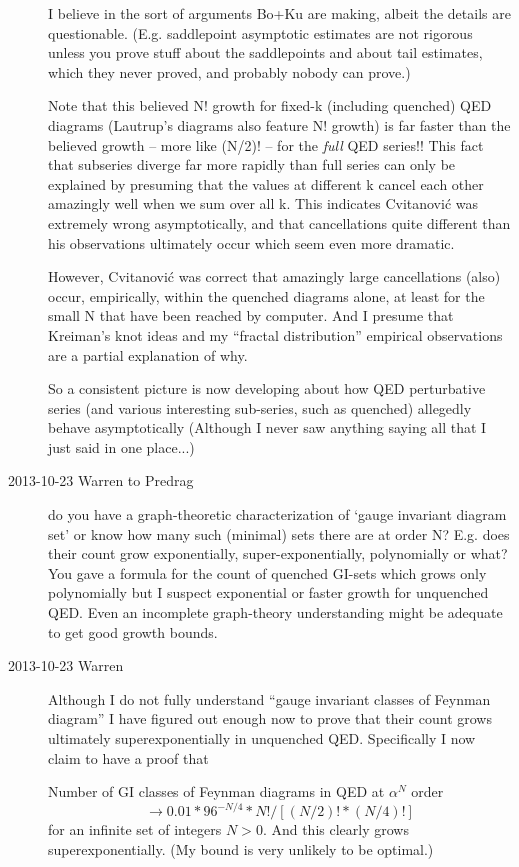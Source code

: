 \begin{description}
I believe in the sort of arguments Bo+Ku are making, albeit the
details are questionable.
(E.g. saddlepoint asymptotic estimates are not rigorous unless you prove stuff
about the saddlepoints and about tail estimates, which they never proved, and
probably nobody can prove.)

Note that this believed N! growth for fixed-k (including quenched) QED diagrams
(Lautrup's diagrams also feature N! growth) is far faster than the
believed growth -- more like (N/2)! -- for the \emph{full} QED series!!
This fact that subseries diverge far more rapidly than full series
can only be explained by presuming that
the values at different k cancel each other amazingly well when we sum
over all k.
This indicates Cvitanovi\'c was extremely wrong asymptotically, and that
cancellations
quite different than his observations ultimately occur which seem even
more dramatic.

However, Cvitanovi\'c was correct that amazingly large cancellations
(also) occur, empirically, within the quenched diagrams alone, at
least for the small N that have been reached by computer.   And I
presume that Kreiman's knot
ideas and my ``fractal distribution'' empirical observations are a
partial explanation of why.

So a consistent picture is now developing about how QED perturbative series (and
various interesting sub-series, such as quenched) allegedly behave
asymptotically
(Although I never saw anything saying all that I just said in one place...)

\item[2013-10-23  Warren to Predrag]  do you have a graph-theoretic
characterization of `gauge invariant diagram set' or know how many such
(minimal) sets there are at order N?   E.g. does their count grow
exponentially, super-exponentially, polynomially or what?  You gave a
formula for the count of quenched GI-sets which grows only polynomially
but I suspect exponential or faster growth for unquenched QED.  Even an
incomplete graph-theory understanding might be adequate to get good growth
bounds.

\item[2013-10-23 Warren]
Although I do not fully understand ``gauge invariant classes of Feynman diagram''
I have figured out enough now to prove that their count grows
ultimately superexponentially in unquenched QED.  Specifically I now
claim to have a proof that

  Number of GI classes of Feynman diagrams in QED at $\alpha^N$ order
\[
  \to 0.01 *  96^{-N/4} * N! / [ (N/2)! * (N/4)! ]
\]
for an infinite set of integers $N>0$.
And this clearly grows superexponentially.
(My bound is very unlikely to be optimal.)


\end{description}
